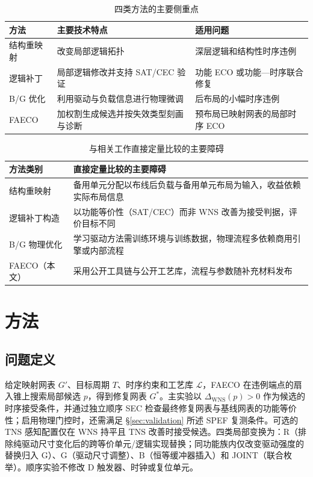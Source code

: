 \documentclass[twocolumn,10pt,fontset=windows]{ctexart}
\begin{document}
\begin{table}[H]
\centering
\caption{四类方法的主要侧重点}
\label{tab:related_diff}
\footnotesize
\setlength{\tabcolsep}{2pt}
\begin{tabular}{>{\raggedright\arraybackslash}p{1.55cm}>{\raggedright\arraybackslash}p{2.55cm}>{\raggedright\arraybackslash}p{3.2cm}}
\toprule
\textbf{方法} & \textbf{主要技术特点} & \textbf{适用问题} \\
\midrule
结构重映射 & 改变局部逻辑拓扑 & 深层逻辑和结构性时序违例 \\
逻辑补丁 & 局部逻辑修改并支持 SAT/CEC 验证 & 功能 ECO 或功能—时序联合修复 \\
B/G 优化 & 利用驱动与负载信息进行物理微调 & 后布局的小幅时序违例 \\
FAECO & 加权割生成候选并按失效类型刻画与诊断 & 预布局已映射网表的局部时序 ECO \\
\bottomrule
\end{tabular}
\end{table}

\begin{table}[ht]
\centering
\caption{与相关工作直接定量比较的主要障碍}
\label{tab:baseline_cmp}
\footnotesize
\setlength{\tabcolsep}{3pt}
\begin{tabular}{>{\raggedright\arraybackslash}p{2.3cm}>{\raggedright\arraybackslash}p{5.0cm}}
\toprule
\textbf{方法类别} & \textbf{直接定量比较的主要障碍} \\
\midrule
结构重映射 & 备用单元分配以布线后负载与备用单元布局为输入，收益依赖实际布局信息 \\
逻辑补丁构造 & 以功能等价性（SAT/CEC）而非 WNS 改善为接受判据，评价目标不同 \\
B/G 物理优化 & 学习驱动方法需训练环境与训练数据，物理流程多依赖商用引擎或内部流程 \\
FAECO（本文） & 采用公开工具链与公开工艺库，流程与参数随补充材料发布 \\
\bottomrule
\end{tabular}
\end{table}


\section{方法}

\subsection{问题定义}
给定映射网表 $G'$、目标周期 $T$、时序约束和工艺库 $\mathcal{L}$，FAECO 在违例端点的扇入锥上搜索局部候选 $p$，得到修复网表 $G^*$。主实验以 $\Delta_{\mathrm{WNS}}(p)>0$ 作为候选的时序接受条件，并通过独立顺序 SEC 检查最终修复网表与基线网表的功能等价性；启用物理门控时，还需满足 \S\ref{sec:validation} 所述 SPEF 复测条件。可选的 TNS 感知配置仅在 WNS 持平且 TNS 改善时接受候选。四类局部变换为：R（排除纯驱动尺寸变化后的跨等价单元/逻辑实现替换；同功能族内仅改变驱动强度的替换归入 G）、G（驱动尺寸调整）、B（恒等缓冲器插入）和 JOINT（联合枚举）。顺序实验不修改 D 触发器、时钟或复位单元。
\end{document}
